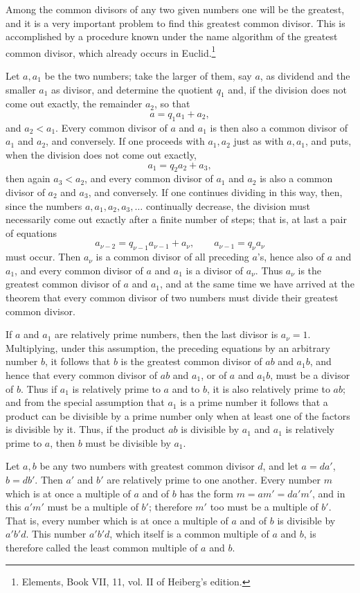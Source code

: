 \documentclass[11pt]{article}
\begin{document}
Among the common divisors of any two given numbers one will be the greatest, and it is a very important problem to find this greatest common divisor. This is accomplished by a procedure known under the name algorithm of the greatest common divisor, which already occurs in Euclid.\footnote{Elements, Book VII, 11, vol. II of Heiberg's edition.}

Let $a,a_1$ be the two numbers; take the larger of them, say $a$, as dividend and the smaller $a_1$ as divisor, and determine the quotient $q_1$ and, if the division does not come out exactly, the remainder $a_2$, so that
\[
  a=q_1a_1+a_2,
\]
and $a_2<a_1$. Every common divisor of $a$ and $a_1$ is then also a common divisor of $a_1$ and $a_2$, and conversely. If one proceeds with $a_1,a_2$ just as with $a,a_1$, and puts, when the division does not come out exactly,
\[
  a_1=q_2a_2+a_3,
\]
then again $a_3<a_2$, and every common divisor of $a_1$ and $a_2$ is also a common divisor of $a_2$ and $a_3$, and conversely. If one continues dividing in this way, then, since the numbers $a,a_1,a_2,a_3,\ldots$ continually decrease, the division must necessarily come out exactly after a finite number of steps; that is, at last a pair of equations
\[
  a_{\nu-2}=q_{\nu-1}a_{\nu-1}+a_\nu,
  \qquad
  a_{\nu-1}=q_\nu a_\nu
\]
must occur. Then $a_\nu$ is a common divisor of all preceding $a$'s, hence also of $a$ and $a_1$, and every common divisor of $a$ and $a_1$ is a divisor of $a_\nu$. Thus $a_\nu$ is the greatest common divisor of $a$ and $a_1$, and at the same time we have arrived at the theorem that every common divisor of two numbers must divide their greatest common divisor.

If $a$ and $a_1$ are relatively prime numbers, then the last divisor is $a_\nu=1$. Multiplying, under this assumption, the preceding equations by an arbitrary number $b$, it follows that $b$ is the greatest common divisor of $ab$ and $a_1b$, and hence that every common divisor of $ab$ and $a_1$, or of $a$ and $a_1b$, must be a divisor of $b$. Thus if $a_1$ is relatively prime to $a$ and to $b$, it is also relatively prime to $ab$; and from the special assumption that $a_1$ is a prime number it follows that a product can be divisible by a prime number only when at least one of the factors is divisible by it. Thus, if the product $ab$ is divisible by $a_1$ and $a_1$ is relatively prime to $a$, then $b$ must be divisible by $a_1$.

Let $a,b$ be any two numbers with greatest common divisor $d$, and let $a=da'$, $b=db'$. Then $a'$ and $b'$ are relatively prime to one another. Every number $m$ which is at once a multiple of $a$ and of $b$ has the form $m=am'=da'm'$, and in this $a'm'$ must be a multiple of $b'$; therefore $m'$ too must be a multiple of $b'$. That is, every number which is at once a multiple of $a$ and of $b$ is divisible by $a'b'd$. This number $a'b'd$, which itself is a common multiple of $a$ and $b$, is therefore called the least common multiple of $a$ and $b$.
\end{document}
